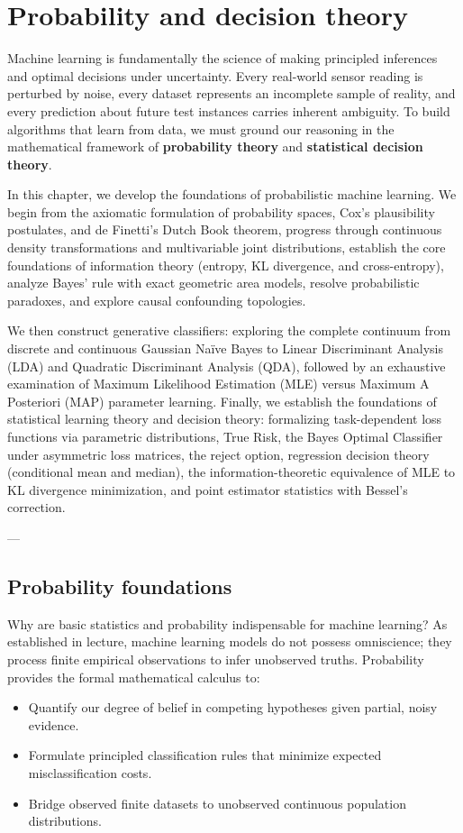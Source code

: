 \chapter{Probability and decision theory}
\label{sec:probability_and_decision_theory}

Machine learning is fundamentally the science of making principled inferences and optimal decisions under uncertainty. Every real-world sensor reading is perturbed by noise, every dataset represents an incomplete sample of reality, and every prediction about future test instances carries inherent ambiguity. To build algorithms that learn from data, we must ground our reasoning in the mathematical framework of \textbf{probability theory} and \textbf{statistical decision theory}.

In this chapter, we develop the foundations of probabilistic machine learning. We begin from the axiomatic formulation of probability spaces, Cox's plausibility postulates, and de Finetti's Dutch Book theorem, progress through continuous density transformations and multivariable joint distributions, establish the core foundations of information theory (entropy, KL divergence, and cross-entropy), analyze Bayes' rule with exact geometric area models, resolve probabilistic paradoxes, and explore causal confounding topologies.

We then construct generative classifiers: exploring the complete continuum from discrete and continuous Gaussian Naïve Bayes to Linear Discriminant Analysis (LDA) and Quadratic Discriminant Analysis (QDA), followed by an exhaustive examination of Maximum Likelihood Estimation (MLE) versus Maximum A Posteriori (MAP) parameter learning. Finally, we establish the foundations of statistical learning theory and decision theory: formalizing task-dependent loss functions via parametric distributions, True Risk, the Bayes Optimal Classifier under asymmetric loss matrices, the reject option, regression decision theory (conditional mean and median), the information-theoretic equivalence of MLE to KL divergence minimization, and point estimator statistics with Bessel's correction.

---

\section{Probability foundations}
\label{sec:foundations_of_probability}

Why are basic statistics and probability indispensable for machine learning? As established in lecture, machine learning models do not possess omniscience; they process finite empirical observations to infer unobserved truths. Probability provides the formal mathematical calculus to:
\begin{itemize}[noitemsep]
  \item Quantify our degree of belief in competing hypotheses given partial, noisy evidence.
  \item Formulate principled classification rules that minimize expected misclassification costs.
  \item Bridge observed finite datasets to unobserved continuous population distributions.
\end{itemize}

